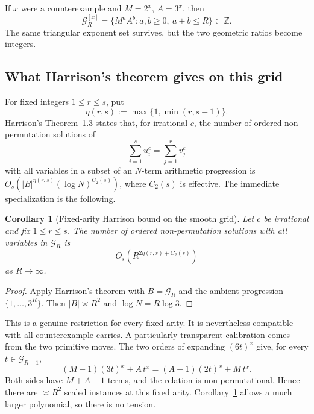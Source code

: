 \documentclass[11pt,oneside]{article}
\newtheorem{corollary}[theorem]{Corollary}
\theoremstyle{definition}
\theoremstyle{remark}
\newcommand{\Z}{\mathbb Z}
\newcommand{\cG}{\mathcal G}
\begin{document}
If $x$ were a counterexample and $M=2^x$, $A=3^x$, then
\begin{equation}
  \cG_R^{[x]}=\{M^aA^b:a,b\ge0,\ a+b\le R\}\subset\Z.
  \label{eq:powered-smooth-grid}
\end{equation}
The same triangular exponent set survives, but the two geometric ratios become integers.

\subsection{What Harrison's theorem gives on this grid}

For fixed integers $1\le r\le s$, put
\[
  \eta(r,s):=\max\{1,\min(r,s-1)\}.
\]
Harrison's Theorem~1.3 states that, for irrational $c$, the number of ordered non-permutation
solutions of
\[
  \sum_{i=1}^{s}u_i^c=\sum_{j=1}^{r}v_j^c
\]
with all variables in a subset of an $N$-term arithmetic progression is
$O_s(|B|^{\eta(r,s)}(\log N)^{C_2(s)})$, where $C_2(s)$ is effective.
The immediate specialization is the following.

\begin{corollary}[Fixed-arity Harrison bound on the smooth grid]
\label{cor:harrison-grid}
Let $c$ be irrational and fix $1\le r\le s$.  The number of ordered non-permutation solutions
with all variables in $\cG_R$ is
\begin{equation}
  O_s\!\left(R^{2\eta(r,s)+C_2(s)}\right)
  \label{eq:harrison-grid-bound}
\end{equation}
as $R\to\infty$.
\end{corollary}

\begin{proof}
Apply Harrison's theorem with $B=\cG_R$ and the ambient progression
$\{1,\ldots,3^R\}$.  Then $|B|\asymp R^2$ and $\log N=R\log3$.
\end{proof}

This is a genuine restriction for every fixed arity.  It is nevertheless compatible with all
counterexample carries.  A particularly transparent calibration comes from the two primitive
moves.  The two orders of expanding $(6t)^x$ give, for every $t\in\cG_{R-1}$,
\begin{equation}
  (M-1)(3t)^x+A\,t^x=(A-1)(2t)^x+M\,t^x.
  \label{eq:plaquette-additive-relation}
\end{equation}
Both sides have $M+A-1$ terms, and the relation is non-permutational.  Hence there are
$\asymp R^2$ scaled instances at this fixed arity.  Corollary~\ref{cor:harrison-grid} allows a
much larger polynomial, so there is no tension.
\end{document}
